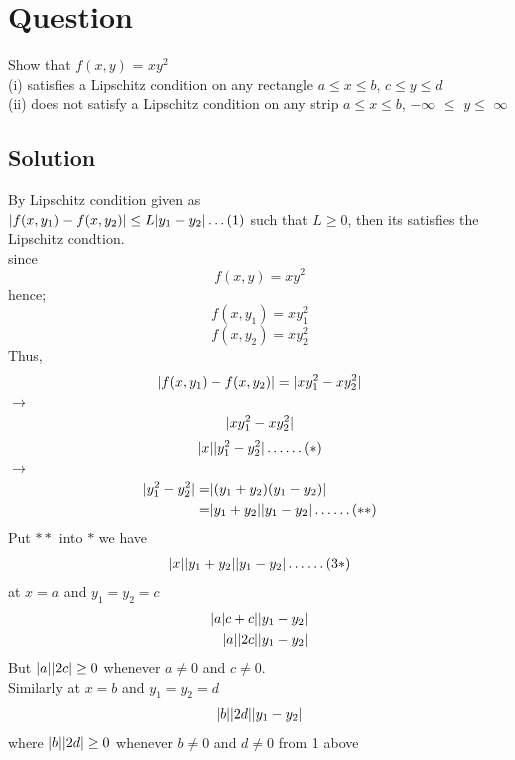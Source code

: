 \documentclass[a4paper, 12pt]{article}
\begin{document}
\break
\section{Question}
Show that $f(x,y)$ = $xy^2$ \\
(i) satisfies a Lipschitz condition on any rectangle $a\le x \le b$, $c\le y \le d $\\
(ii) does not satisfy a Lipschitz condition on any strip $a \le x \le b$, $-\infty$ $\le$ $y \le$ $\infty$ 
\subsection{Solution}
By Lipschitz condition given as\\
$\arrowvert f(x, y_1) - f(x, y_2) \arrowvert \le L \arrowvert y_1 - y_2 \arrowvert \ldots (1)$ such that $L \ge 0$, then its satisfies the Lipschitz condtion.\\
since $$f(x,y) = xy^2$$
hence; $$f(x,y_1) = xy^2_1$$
$$f(x,y_2) = xy^2_2 $$
Thus,
$$ \arrowvert f(x,y_1) - f(x,y_2) \arrowvert = \arrowvert xy^2_1 - xy^2_2 \arrowvert $$
$\rightarrow$ $$\arrowvert xy^2_1 - xy^2_2 \arrowvert$$
$$ \arrowvert x \arrowvert \arrowvert y^2_1 - y^2_2 \arrowvert \ldots \ldots (*)$$
$\rightarrow$ 
\begin{eqnarray}
\nonumber \arrowvert y^2_1 - y^2_2 \arrowvert =& \arrowvert (y_1 + y_2)(y_1-y_2) \arrowvert \\
\nonumber  =& \arrowvert y_1 + y_2\arrowvert \arrowvert y_1-y_2  \arrowvert \ldots \ldots (**)
\end{eqnarray}
Put $**$ into $*$ we have
\begin{eqnarray}
\nonumber \arrowvert x \arrowvert \arrowvert y_1 +y_2 \arrowvert \arrowvert y_1 - y_2 \arrowvert \ldots \ldots (3*)
\end{eqnarray} at $x = a $ and $y_1=y_2=c$
\begin{eqnarray}
\nonumber \arrowvert a \arrowvert c+c \arrowvert \arrowvert y_1 - y_2 \arrowvert \\
\nonumber \arrowvert a \arrowvert \arrowvert 2c \arrowvert \arrowvert y_1 - y_2 \arrowvert
\end{eqnarray} But $\arrowvert a \arrowvert \arrowvert 2c \arrowvert \ge 0 $ whenever $a \neq 0$ and $c \neq 0 $.\\ Similarly at $x=b$ and $y_1=y_2=d$
\begin{eqnarray}
\nonumber \arrowvert b \arrowvert \arrowvert 2d \arrowvert \arrowvert y_1 - y_2 \arrowvert
\end{eqnarray} where $\arrowvert b \arrowvert \arrowvert 2d \arrowvert \ge 0 $ whenever $b \neq 0 $ and $d \neq 0$ from 1 above\\
\end{document}
